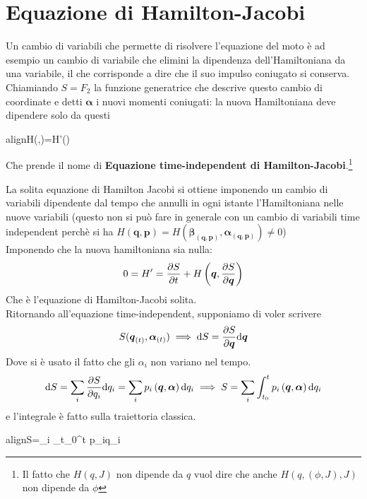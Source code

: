 \documentclass[a4paper,12pt]{article}
\renewcommand{\arg}[1]{_{(#1)}}
\newcommand{\boxedeq}[2]{\begin{empheq}[box={\fboxsep=6pt\fbox}]{align}\label{#1}#2\end{empheq}}
\theoremstyle{plain}
\renewcommand{\vec}[1]{{\boldsymbol{#1}}}
\theoremstyle{definition}
\newcommand{\f}[2]{\frac{#1}{#2}}
\renewcommand{\d}{\text{d}}
\newcommand{\mom}{\vec{p}}
\newcommand{\argg}[1]{\left(#1\right)}
\theoremstyle{remark}
\begin{document}
\section{Equazione di Hamilton-Jacobi}
Un cambio di variabili che permette di risolvere l'equazione del moto è ad esempio un cambio di variabile che elimini la dipendenza dell'Hamiltoniana da una variabile, il che corrisponde a dire che il suo impulso coniugato si conserva.\\
Chiamiando $S=F_2$ la funzione generatrice che descrive questo cambio di coordinate e detti $\vec{\alpha}$ i nuovi momenti coniugati: la nuova Hamiltoniana deve dipendere solo da questi
\boxedeq{tindHJ}{H\left(\vec{q},\f{\partial S(\vec{q},\vec{\alpha})}{\partial\vec{q}}\right)=H'(\vec{\alpha})}
Che prende il nome di \textbf{Equazione time-independent di Hamilton-Jacobi}.\footnote{
Il fatto che $H(q,J)$ non dipende da $q$ vuol dire che anche $H(q,(\phi,J),J)$ non dipende da $\phi$}



La solita equazione di Hamilton Jacobi si ottiene imponendo un cambio di variabili dipendente dal tempo che  annulli in ogni istante l'Hamiltoniana nelle nuove variabili (questo non si può fare in generale con un cambio di variabili time independent perchè si ha $H\argg{\vec{q},\mom}=H\left(\vec{\beta}\arg{\vec{q},\mom},\vec{\alpha}\arg{\vec{q},\mom}\right)\ne0$)
\\ Imponendo che la nuova hamiltoniana sia nulla:
\[0=H'=\pdv{S}{t}+H\left(\vec{q},\f{\partial S}{\partial\vec{q}}\right)\]
Che è l'equazione di Hamilton-Jacobi solita.
\\Ritornando all'equazione time-independent, supponiamo di voler scrivere \[S(\vec{q}\arg{t},\vec{\alpha}\arg{t})\implies\d S=\pdv{S}{\vec{q}}\d\vec{q}\]
Dove si è usato il fatto che gli $\alpha_i$ non variano nel tempo.
\[\d S=\sum_i \pdv{S}{q_i}\d q_i=\sum_i p_i\argg{\vec{q},\vec{\alpha}}\d q_i\implies S=\sum_i\int_{t_0}^t	p_i\argg{\vec{q},\vec{\alpha}}\d q_i	\]
e l'integrale è fatto sulla traiettoria classica.

\boxedeq{tindHJ2}{S=\sum_i \int_{t_0}^t	p_i\d q_i}
\end{document}
